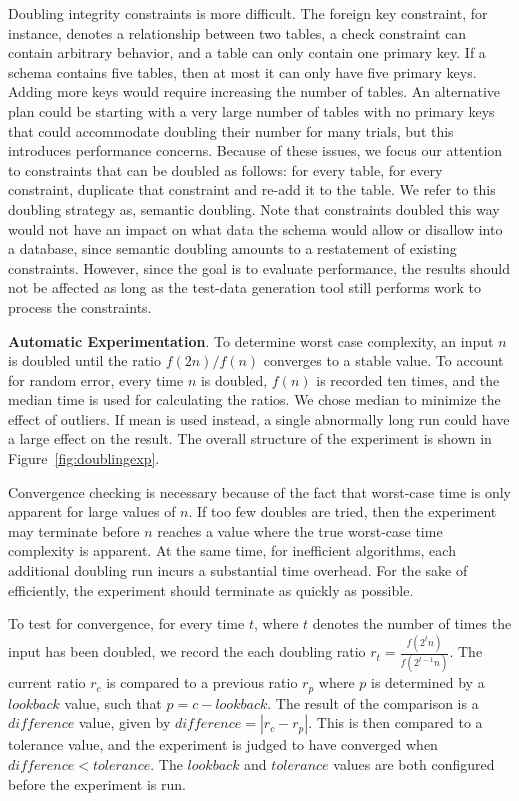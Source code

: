   Doubling integrity constraints is more difficult.  The foreign key constraint, for instance, denotes a relationship
  between two tables, a check constraint can contain arbitrary behavior, and a table can only contain one primary key.
  If a schema contains five tables, then at most it can only have five primary keys.  Adding more keys would require
  increasing the number of tables.  An alternative plan could be starting with a very large number of tables with no
  primary keys that could accommodate doubling their number for many trials, but this introduces performance concerns.
  Because of these issues, we focus our attention to constraints that can be doubled as follows: for every table, for
  every constraint, duplicate that constraint and re-add it to the table.  We refer to this doubling strategy as,
  semantic doubling.  Note that constraints doubled this way would not have an impact on what data the schema would
  allow or disallow into a database, since semantic doubling amounts to a restatement of existing constraints.  However,
  since the goal is to evaluate performance, the results should not be affected as long as the test-data generation tool
  still performs work to process the constraints.


  \textbf{Automatic Experimentation}. To determine worst case complexity, an input $n$ is doubled until the ratio $f(2n)
  / f(n)$ converges to a stable value.  To account for random error, every time $n$ is doubled, $f(n)$ is recorded ten
  times, and the median time is used for calculating the ratios.  We chose median to minimize the effect of outliers. If
  mean is used instead, a single abnormally long run could have a large effect on the result. The overall structure of
  the experiment is shown in Figure~\ref{fig:doublingexp}.

  Convergence checking is necessary because of the fact that worst-case time is only apparent for large values of $n$.
  If too few doubles are tried, then the experiment may terminate before $n$ reaches a value where the true worst-case
  time complexity is apparent. At the same time, for inefficient  algorithms, each additional doubling run incurs a
  substantial time overhead. For the sake of efficiently, the experiment should terminate as quickly as possible.

  To test for convergence, for every time $t$, where $t$ denotes the number of times the input has been doubled, we
  record the each doubling ratio $r_t = \frac{f(2^t n)}{f(2^{t-1}n)}$. The current ratio $r_c$ is compared to a previous
  ratio $r_p$ where $p$ is determined by a $\mathit{lookback}$ value, such that $p=c-\mathit{lookback}$.  The result of
  the comparison is a $\mathit{difference}$ value, given by $\mathit{difference} = |r_c - r_p|$.  This is then compared
  to a tolerance value, and the experiment is judged to have converged when $\mathit{difference}<\mathit{tolerance}$.
  The $\mathit{lookback}$ and $\mathit{tolerance}$ values are both configured before the experiment is run.

